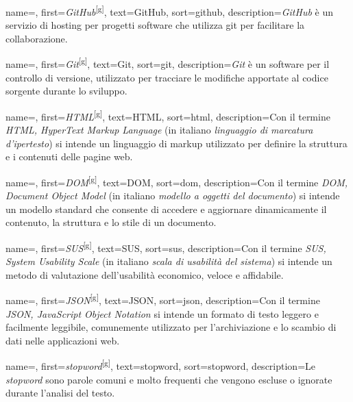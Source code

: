  {
    name=,
    first={\textit{GitHub}\textsuperscript{[g]}},
    text=GitHub,
    sort=github,
    description={\textit{GitHub} è un servizio di hosting per progetti software che utilizza \gls{git} per facilitare la collaborazione.}
}

 {
    name=,
    first={\textit{Git}\textsuperscript{[g]}},
    text=Git,
    sort=git,
    description={\textit{Git} è un software per il controllo di versione, utilizzato per tracciare le modifiche apportate al codice sorgente durante lo sviluppo.}
}

 {
    name=,
    first={\textit{HTML}\textsuperscript{[g]}},
    text=HTML,
    sort=html,
    description={Con il termine \textit{HTML, HyperText Markup Language} (in italiano \textit{linguaggio di marcatura d'ipertesto}) si intende un linguaggio di markup utilizzato per definire la struttura e i contenuti delle pagine web.}
}

 {
    name=,
    first={\textit{DOM}\textsuperscript{[g]}},
    text=DOM,
    sort=dom,
    description={Con il termine \textit{DOM, Document Object Model} (in italiano \textit{modello a oggetti del documento}) si intende un modello standard che consente di accedere e aggiornare dinamicamente il contenuto, la struttura e lo stile di un documento.}
}

 {
    name=,
    first={\textit{SUS}\textsuperscript{[g]}},
    text=SUS,
    sort=sus,
    description={Con il termine \textit{SUS, System Usability Scale} (in italiano \textit{scala di usabilità del sistema}) si intende un metodo di valutazione dell'usabilità economico, veloce e affidabile.}
}

 {
    name=,
    first={\textit{JSON}\textsuperscript{[g]}},
    text=JSON,
    sort=json,
    description={Con il termine \textit{JSON, JavaScript Object Notation} si intende un formato di testo leggero e facilmente leggibile, comunemente utilizzato per l’archiviazione e lo scambio di dati nelle applicazioni web.}
}

 {
    name=,
    first={\textit{stopword}\textsuperscript{[g]}},
    text=stopword,
    sort=stopword,
    description={Le \textit{stopword} sono parole comuni e molto frequenti che vengono escluse o ignorate durante l’analisi del testo.}
}

